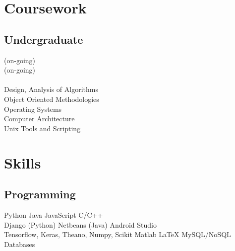 \documentclass[]{deedy-resume-openfont}
\begin{document}
\begin{minipage}[t]{0.33\textwidth}

\section{Coursework}

\subsection{Undergraduate}
 (on-going) \\
(on-going)\\
\\
Design, Analysis of Algorithms\\
Object Oriented Methodologies \\
Operating Systems \\
Computer Architecture\\
Unix Tools and Scripting \\
\sectionsep


\section{Skills}
\subsection{Programming}
Python \textbullet{}   Java \textbullet{} JavaScript \textbullet{} C/C++ \\
Django (Python) \textbullet{} Netbeans (Java) \textbullet{} Android Studio \\
Tensorflow, Keras, Theano, Numpy, Scikit
Matlab \textbullet{} \LaTeX \textbullet{} MySQL/NoSQL Databases
\sectionsep

%
%

\end{minipage} 
\hfill
\end{document}
